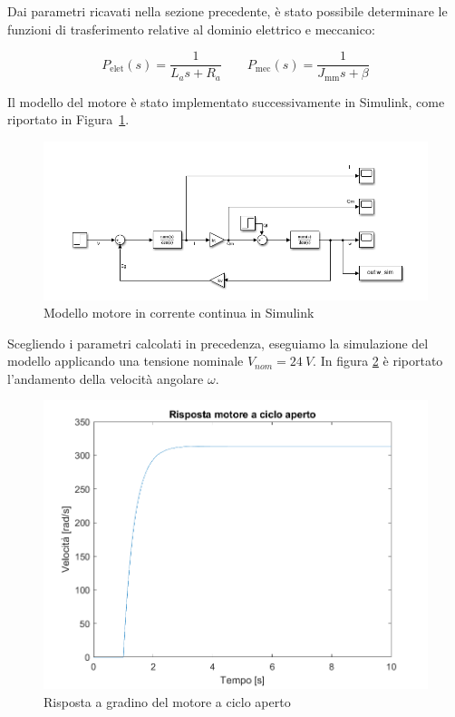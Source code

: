 \documentclass[a4paper,12pt]{article}
\begin{document}
\vspace{0.3cm}

Dai parametri ricavati nella sezione precedente, è stato possibile determinare le funzioni di trasferimento relative al dominio elettrico e meccanico:

\vspace{0.5cm}

$$
P_{\text{elet}}(s) = \frac{1}{L_a s + R_a} \quad\quad
P_{\text{mec}}(s) = \frac{1}{J_{\text{mm}} s + \beta}
$$

\vspace{0.5cm}

Il modello del motore è stato implementato successivamente in Simulink, come riportato in Figura~\ref{fig:modello_simulink}.


\begin{figure}[h!]
\centering
    \includegraphics[scale=0.6]{Immagini/Altre/motoreSimulink.PNG} 
    \caption{Modello motore in corrente continua in Simulink}
    \label{fig:modello_simulink}
\end{figure}
\vspace{0.5cm}

Scegliendo i parametri calcolati in precedenza, eseguiamo la simulazione del modello applicando una tensione nominale $V_{nom}=24~V$. In figura \ref{fig: ciclo aperto} è riportato l'andamento della velocità angolare $\omega$.

\vspace{0.3cm}

\begin{figure}[h!]
\centering
    \includegraphics[scale=0.6]{Immagini/PlotMatlab/rispostaMotoreCicloAperto.png} 
    \caption{Risposta a gradino del motore a ciclo aperto}
    \label{fig: ciclo aperto}
\end{figure}
\end{document}
